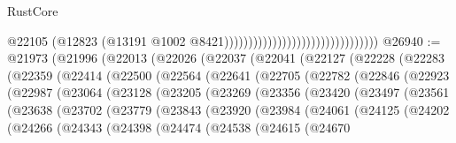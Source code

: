 \begin{lexlean}{RustCore}
\begin{coremodule}
                                                                @22105
                                                                (@12823
                                                                  (@13191
                                                                    @1002
                                                                    @8421))))))))))))))))))))))))))))))))
@26940 := @21973
    (@21996
      (@22013
        (@22026
          (@22037
            (@22041
              (@22127
                (@22228
                  (@22283
                    (@22359
                      (@22414
                        (@22500
                          (@22564
                            (@22641
                              (@22705
                                (@22782
                                  (@22846
                                    (@22923
                                      (@22987
                                        (@23064
                                          (@23128
                                            (@23205
                                              (@23269
                                                (@23356
                                                  (@23420
                                                    (@23497
                                                      (@23561
                                                        (@23638
                                                          (@23702
                                                            (@23779
                                                              (@23843
                                                                (@23920
                                                                  (@23984
                                                                    (@24061
                                                                      (@24125
                                                                        (@24202
                                                                          (@24266
                                                                            (@24343
                                                                              (@24398
                                                                                (@24474
                                                                                  (@24538
                                                                                    (@24615
                                                                                      (@24670

\end{coremodule}
\end{lexlean}
